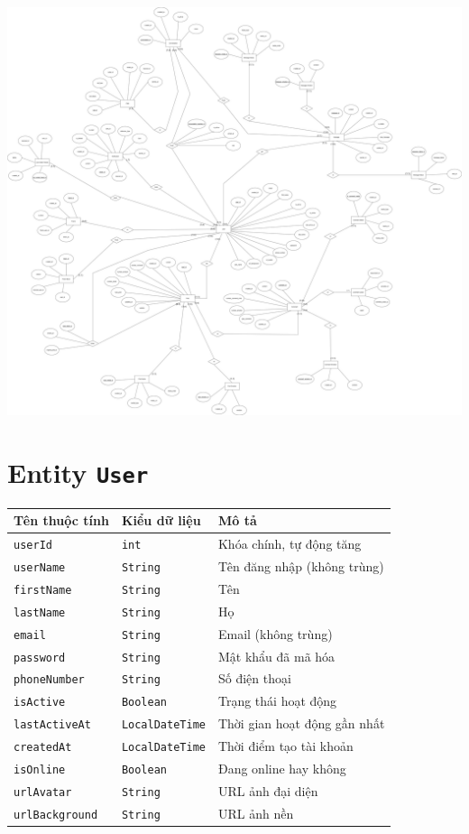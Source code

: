 
\includegraphics[width=\textwidth]{img/ERD_Instagram.png}

\section{Entity \texttt{User}}

\begin{longtable}{|>{\raggedright\arraybackslash}p{4cm}|>{\raggedright\arraybackslash}p{4cm}|>{\raggedright\arraybackslash}p{6cm}|}
\hline
\textbf{Tên thuộc tính} & \textbf{Kiểu dữ liệu} & \textbf{Mô tả} \\
\hline
\texttt{userId} & \texttt{int} & Khóa chính, tự động tăng \\
\hline
\texttt{userName} & \texttt{String} & Tên đăng nhập (không trùng) \\
\hline
\texttt{firstName} & \texttt{String} & Tên \\
\hline
\texttt{lastName} & \texttt{String} & Họ \\ 
\hline
\texttt{email} & \texttt{String} & Email (không trùng) \\
\hline
\texttt{password} & \texttt{String} & Mật khẩu đã mã hóa \\
\hline
\texttt{phoneNumber} & \texttt{String} & Số điện thoại \\
\hline
\texttt{isActive} & \texttt{Boolean} & Trạng thái hoạt động \\
\hline
\texttt{lastActiveAt} & \texttt{LocalDateTime} & Thời gian hoạt động gần nhất \\
\hline
\texttt{createdAt} & \texttt{LocalDateTime} & Thời điểm tạo tài khoản \\
\hline
\texttt{isOnline} & \texttt{Boolean} & Đang online hay không \\
\hline
\texttt{urlAvatar} & \texttt{String} & URL ảnh đại diện \\
\hline
\texttt{urlBackground} & \texttt{String} & URL ảnh nền \\
\hline
\end{longtable}


